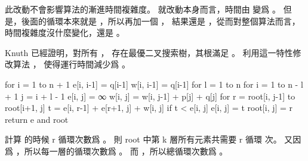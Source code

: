 \startANSWER
此改動不會影響算法的漸進時間複雜度。
就改動本身而言，時間由  變爲 。
但是，後面的循環本來就是 ，所以再加一個 ，
結果還是 ，從而對整個算法而言，時間複雜度沒什麼變化，還是 。
\stopANSWER

\startEXERCISE
Knuth 已經證明，對所有 ，
存在最優二叉搜索樹，其根滿足 。
利用這一特性修改算法 ，
使得運行時間減少爲 。
\stopEXERCISE

\startANSWER
{}
\startCLRS
for i = 1 to n + 1
	e[i, i-1] = q[i-1]
	w[i, i-1] = q[i-1]
for l = 1 to n
	for i = 1 to n - l + 1
		j = i + l - 1
		e[i, j] = ∞
		w[i, j] = w[i, j-1] + p[j] + q[j]
		for r = root[i, j-1] to root[i+1, j]
			t = e[i, r-1] + e[r+1, j] + w[i, j]
			if t < e[i, j]
				e[i, j] = t
				root[i, j] = r
return e and root
\stopCLRS

計算  的時候 r 循環次數爲 。
則 root 中第 k 層所有元素共需要 r 循環  次。
又因爲 ，所以每一層的循環次數爲 。
而 ，所以總循環次數爲 。
\stopANSWER

\stopsection
